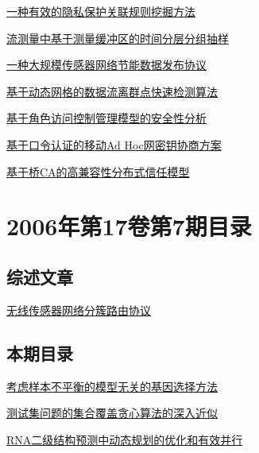 \documentclass[a4paper]{article}
\begin{document}
\href{http://www.jos.org.cn/ch/reader/download_pdf.aspx?file_no=20060811&year_id=2006&quarter_id=8&falg=1}{一种有效的隐私保护关联规则挖掘方法}

\href{http://www.jos.org.cn/ch/reader/download_pdf.aspx?file_no=20060812&year_id=2006&quarter_id=8&falg=1}{流测量中基于测量缓冲区的时间分层分组抽样}

\href{http://www.jos.org.cn/ch/reader/download_pdf.aspx?file_no=20060813&year_id=2006&quarter_id=8&falg=1}{一种大规模传感器网络节能数据发布协议}

\href{http://www.jos.org.cn/ch/reader/download_pdf.aspx?file_no=20060814&year_id=2006&quarter_id=8&falg=1}{基于动态网格的数据流离群点快速检测算法}

\href{http://www.jos.org.cn/ch/reader/download_pdf.aspx?file_no=20060815&year_id=2006&quarter_id=8&falg=1}{基于角色访问控制管理模型的安全性分析}

\href{http://www.jos.org.cn/ch/reader/download_pdf.aspx?file_no=20060816&year_id=2006&quarter_id=8&falg=1}{基于口令认证的移动Ad Hoc网密钥协商方案}

\href{http://www.jos.org.cn/ch/reader/download_pdf.aspx?file_no=20060817&year_id=2006&quarter_id=8&falg=1}{基于桥CA的高兼容性分布式信任模型}


\section{\textbf{2006年第17卷第7期目录}}
\subsection{综述文章}
\href{http://www.jos.org.cn/ch/reader/download_pdf.aspx?file_no=20060713&year_id=2006&quarter_id=7&falg=1}{无线传感器网络分簇路由协议}

\subsection{本期目录}
\href{http://www.jos.org.cn/ch/reader/download_pdf.aspx?file_no=20060701&year_id=2006&quarter_id=7&falg=1}{考虑样本不平衡的模型无关的基因选择方法}

\href{http://www.jos.org.cn/ch/reader/download_pdf.aspx?file_no=20060702&year_id=2006&quarter_id=7&falg=1}{测试集问题的集合覆盖贪心算法的深入近似}

\href{http://www.jos.org.cn/ch/reader/download_pdf.aspx?file_no=20060703&year_id=2006&quarter_id=7&falg=1}{RNA二级结构预测中动态规划的优化和有效并行}
\end{document}
